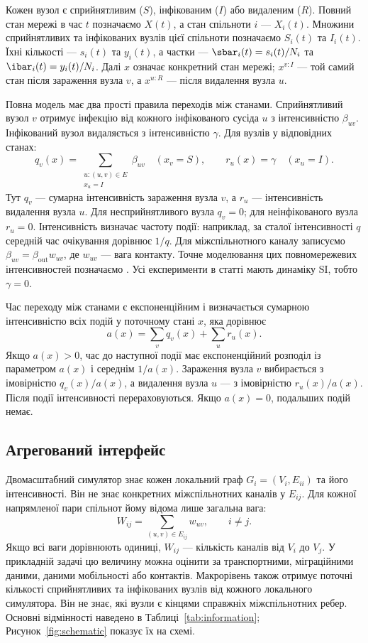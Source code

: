 Кожен вузол є сприйнятливим ($S$), інфікованим ($I$) або видаленим ($R$). Повний стан мережі в час $t$ позначаємо $X(t)$, а стан спільноти $i$ --- $X_i(t)$. Множини сприйнятливих та інфікованих вузлів цієї спільноти позначаємо $S_i(t)$ та $I_i(t)$. Їхні кількості --- $s_i(t)$ та $y_i(t)$, а частки --- $\sbar_i(t)=s_i(t)/N_i$ та $\ibar_i(t)=y_i(t)/N_i$. Далі $x$ означає конкретний стан мережі; $x^{v:I}$ --- той самий стан після зараження вузла $v$, а $x^{u:R}$ --- після видалення вузла $u$.

Повна модель має два прості правила переходів між станами. Сприйнятливий вузол $v$ отримує інфекцію від кожного інфікованого сусіда $u$ з інтенсивністю $\beta_{uv}$. Інфікований вузол видаляється з інтенсивністю $\gamma$. Для вузлів у відповідних станах:
\begin{equation}
\label{eq:full_generator}
q_v(x)=\sum_{\substack{u:(u,v)\in E\\x_u=I}}\beta_{uv}
\quad (x_v=S),
\qquad r_u(x)=\gamma\quad (x_u=I).
\end{equation}
Тут $q_v$ --- сумарна інтенсивність зараження вузла $v$, а $r_u$ --- інтенсивність видалення вузла $u$. Для несприйнятливого вузла $q_v=0$; для неінфікованого вузла $r_u=0$. Інтенсивність визначає частоту події: наприклад, за сталої інтенсивності $q$ середній час очікування дорівнює $1/q$.  Для міжспільнотного каналу записуємо $\beta_{uv}=\beta_{\mathrm{out}}w_{uv}$, де $w_{uv}$ --- вага контакту. Точне моделювання цих повномережевих інтенсивностей позначаємо \Full{}. Усі експерименти в статті мають динаміку SI, тобто $\gamma=0$.

Час переходу між станами є експоненційним і визначається сумарною інтенсивністю всіх подій у поточному стані $x$, яка дорівнює
\[
a(x)=\sum_v q_v(x)+\sum_u r_u(x).
\]
Якщо $a(x)>0$, час до наступної події має експоненційний розподіл із параметром $a(x)$ і середнім $1/a(x)$.
Зараження вузла $v$ вибирається з імовірністю $q_v(x)/a(x)$, а видалення вузла $u$ --- з імовірністю $r_u(x)/a(x)$.
Після події інтенсивності перераховуються.
Якщо $a(x)=0$, подальших подій немає.

\subsection{Агрегований інтерфейс}
\label{sec:interface}

Двомасштабний симулятор \TS{} знає кожен локальний граф $G_i=(V_i,E_{ii})$ та його інтенсивності. Він не знає конкретних міжспільнотних каналів у $E_{ij}$. Для кожної напрямленої пари спільнот йому відома лише загальна вага:
\begin{equation}
\label{eq:weight}
W_{ij}=\sum_{(u,v)\in E_{ij}}w_{uv},\qquad i\neq j.
\end{equation}
Якщо всі ваги дорівнюють одиниці, $W_{ij}$ --- кількість каналів від $V_i$ до $V_j$. У прикладній задачі цю величину можна оцінити за транспортними, міграційними даними, даними мобільності або контактів. Макрорівень також отримує поточні кількості сприйнятливих та інфікованих вузлів від кожного локального симулятора. Він не знає, які вузли є кінцями справжніх міжспільнотних ребер. Основні відмінності наведено в Таблиці~\ref{tab:information}; Рисунок~\ref{fig:schematic} показує їх на схемі.

